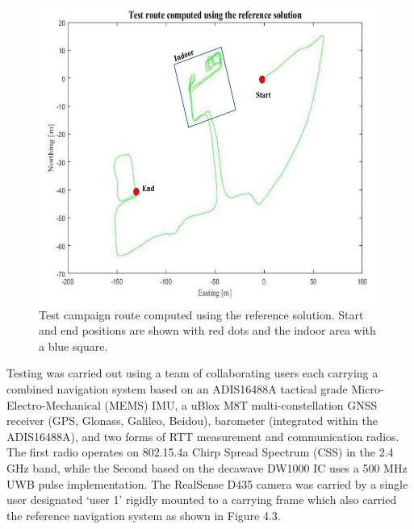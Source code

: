 \begin{figure}
    \centering
    \includegraphics{fig11.jpg}
    \caption{Test campaign route computed using the reference solution.
Start and end positions are shown with red dots and the indoor area with
a blue square.}
    
\end{figure}  
Testing was carried out using a team of collaborating users each carrying a combined navigation system
based on an ADIS16488A tactical grade Micro-Electro-Mechanical (MEMS) IMU, a uBlox M8T multi-constellation
GNSS receiver (GPS, Glonass, Galileo, Beidou), barometer
(integrated within the ADIS16488A), and two forms of
RTT measurement and communication radios. The first radio
operates on 802.15.4a Chirp Spread Spectrum (CSS) in the
2.4 GHz band, while the Second based on the decawave
DW1000 IC uses a 500 MHz UWB pulse implementation.
The RealSense D435 camera was carried by a single user
designated ‘user 1’ rigidly mounted to a carrying frame which
also carried the reference navigation system as shown in
Figure 4.3.\\
